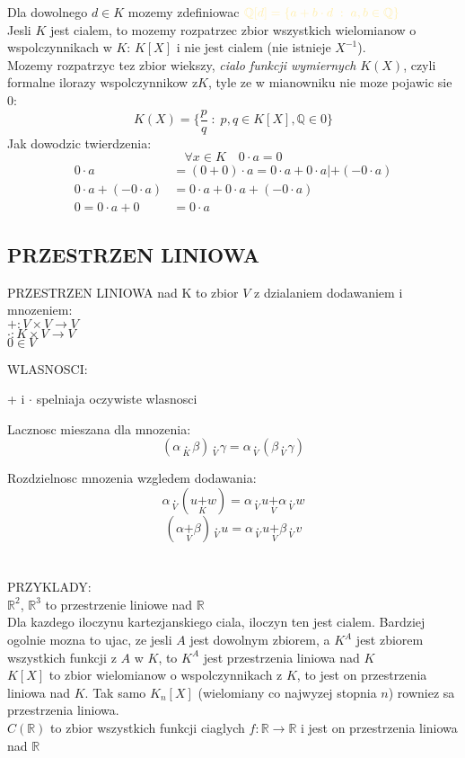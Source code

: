 \documentclass{article}
\newcommand{\R}{\mathbb{R}}
\newcommand{\Q}{\mathbb{Q}}
\begin{document}
  Dla dowolnego $d\in K$ mozemy zdefiniowac $\color{acc}\Q[d]=\{a+b\cdot d\;:\;a,b\in\Q\}$\medskip\\
  Jesli $K$ jest cialem, to mozemy rozpatrzec zbior wszystkich wielomianow o wspolczynnikach w $K$: $K[X]$ i nie jest cialem (nie istnieje $X^{-1}$).\smallskip\\
  Mozemy rozpatrzyc tez zbior wiekszy, \color{def}\emph{cialo funkcji wymiernych} $K(X)$\color{txt}, czyli formalne ilorazy wspolczynnikow z$K$, tyle ze w mianowniku nie moze pojawic sie 0:
  $$K(X)=\{\frac{p}{q}\;:\;p,q\in K[X], \Q\in 0\}$$
  Jak dowodzic twierdzenia:
  $$\forall x\in K\quad 0\cdot a= 0$$
  \begin{align*}
    0\cdot a &= (0+0)\cdot a = 0\cdot a + 0\cdot a | + (- 0\cdot a)\\
    0\cdot a + (-0\cdot a) &= 0\cdot a + 0\cdot a+(-0\cdot a)\\
    0 = 0\cdot a + 0 &= 0\cdot a
  \end{align*}
\subsection*{PRZESTRZEN LINIOWA}
  \begin{center}
    \color{def}PRZESTRZEN LINIOWA nad K \color{txt}to zbior $V$ z dzialaniem dodawaniem i mnozeniem:\smallskip\\
    $+:V\times V\to V$\smallskip\\
    $\cdot:K\times V\to V$\smallskip\\
    $0\in V$
  \end{center}
  \color{def}WLASNOSCI:\color{txt}\smallskip\par
    + i $\cdot$ spelniaja oczywiste wlasnosci\smallskip\par
    Lacznosc mieszana dla mnozenia:
    $$(\alpha \underset{K}{\cdot}\beta)\underset{V}{\cdot}\gamma = \alpha\underset{V}{\cdot}(\beta\underset{V}{\cdot}\gamma)$$\par
    Rozdzielnosc mnozenia wzgledem dodawania:
    $$\alpha\underset{V}{\cdot}(u\underset{K}{+}w) = \alpha\underset{V}{\cdot}u\underset{V}{+}\alpha\underset{V}{\cdot}w$$
    $$(\alpha\underset{V}{+}\beta)\underset{V}{\cdot}u = \alpha\underset{V}{\cdot}u\underset{V}{+}\beta\underset{V}{\cdot}v$$ \\ \\
  \color{emp}PRZYKLADY:\color{txt}\smallskip\\
    $\R^2$, $\R^3$ to przestrzenie liniowe nad $\R$\medskip\\
    Dla kazdego iloczynu kartezjanskiego ciala, iloczyn ten jest cialem. Bardziej ogolnie mozna to ujac, ze jesli $A$ jest dowolnym zbiorem, a $K^A$ jest zbiorem wszystkich funkcji z $A$ w $K$, to $K^A$ jest przestrzenia liniowa nad $K$\medskip\\
    $K[X]$ to zbior wielomianow o wspolczynnikach z $K$, to jest on przestrzenia liniowa nad $K$. Tak samo $K_n[X]$ (wielomiany co najwyzej stopnia $n$) rowniez sa przestrzenia liniowa.\medskip\\
    $C(\R)$ to zbior wszystkich funkcji ciaglych $f:\R\to\R$ i jest on przestrzenia liniowa nad $\R$
\end{document}
